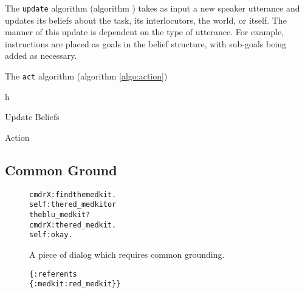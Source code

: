 \documentclass[12pt]{article}
\begin{document}
The \texttt{update} algorithm (algorithm \pageref{algo:update}) takes
as input a new speaker utterance and updates its beliefs about the
task, its interlocutors, the world, or itself. The manner of this
update is dependent on the type of utterance. For example,
instructions are placed as goals in the belief structure, with
sub-goals being added as necessary.

The \texttt{act} algorithm (algorithm \ref{algo:action})


\begin{algorithm}{h}
  \DontPrintSemicolon
  \caption{Update Beliefs}
  \label{algo:update}
\end{algorithm}


\begin{algorithm}
  \DontPrintSemicolon
  
  \caption{Action}
  \label{algo:action}
\end{algorithm}

\subsection{Common Ground}
\begin{wrapfigure}{r}{0.5\textwidth}
  \label{fig:cg_text}
  \caption{A piece of dialog which requires common grounding.}
  \begin{alltt}
    cmdrX: find the medkit.
    self:  the red_medkit or
    the blu_medkit?
    cmdrX: the red_medkit.
    self:  okay.
  \end{alltt}
\end{wrapfigure}

\begin{wrapfigure}{r}{0.5\textwidth}
  \begin{alltt}
    \{:referents
    \{:medkit :red_medkit\}\}
  \end{alltt}
\end{wrapfigure}
\end{document}
